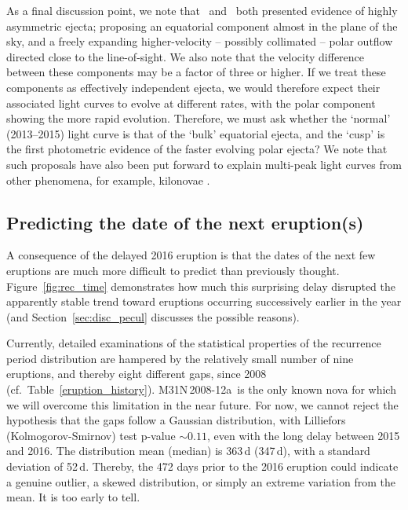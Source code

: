 \documentclass[twocolumn,tighten]{aastex6}
\def\nova{{M31N\,2008-12a~}}
\newcommand{\othreek}{\citetalias{2016ApJ...833..149D}}
\newcommand{\hstspec}{\citetalias{2017ApJ...847...35D}}
\begin{document}
As a final discussion point, we note that \othreek\ and \hstspec\ both presented evidence of highly asymmetric ejecta; proposing an equatorial component almost in the plane of the sky, and a freely expanding higher-velocity -- possibly collimated -- polar outflow directed close to the line-of-sight.  We also note that the velocity difference between these components may be a factor of three or higher.  If we treat these components as effectively independent ejecta, we would therefore expect their associated light curves to evolve at different rates, with the polar component showing the more rapid evolution.  Therefore, we must ask whether the `normal' (2013--2015) light curve is that of the `bulk' equatorial ejecta, and the `cusp' is the first photometric evidence of the faster evolving polar ejecta?  We note that such proposals have also been put forward to explain multi-peak light curves from other phenomena, for example, kilonovae \citep[see][and the references therein]{2017ApJ...851L..21V}.

\subsection{Predicting the date of the next eruption(s)}
\label{sec:disc_next}

A consequence of the delayed 2016 eruption is that the dates of the next few eruptions are much more difficult to predict than previously thought. Figure~\ref{fig:rec_time} demonstrates how much this surprising delay disrupted the apparently stable trend toward eruptions occurring successively earlier in the year (and Section~\ref{sec:disc_pecul} discusses the possible reasons).

Currently, detailed examinations of the statistical properties of the recurrence period distribution are hampered by the relatively small number of nine eruptions, and thereby eight different gaps, since 2008 (cf.\ Table~\ref{eruption_history}). \nova is the only known nova for which we will overcome this limitation in the near future. For now, we cannot reject the hypothesis that the gaps follow a Gaussian distribution, with Lilliefors (Kolmogorov-Smirnov) test p-value $\sim 0.11$, even with the long delay between 2015 and 2016. The distribution mean (median) is 363\,d (347\,d), with a standard deviation of 52\,d. Thereby, the 472 days prior to the 2016 eruption could indicate a genuine outlier, a skewed distribution, or simply an extreme variation from the mean. It is too early to tell.
\end{document}
